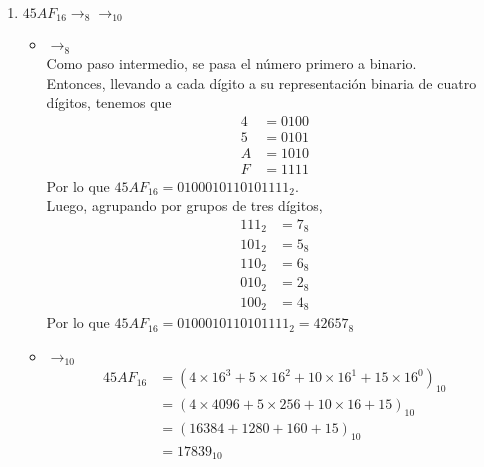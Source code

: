 \documentclass{article}
\begin{document}
\begin{enumerate}
{\begin{itemize}
{                }
            \end{itemize}
        }
        \item {
            $45AF_{16} \rightarrow_8 \rightarrow_{10}$
            \begin{itemize}
                \item {
                    $\rightarrow_8$ \\
                    Como paso intermedio, se pasa el número primero a binario.\\
                    Entonces, llevando a cada dígito a su representación 
                    binaria de cuatro dígitos, tenemos que 
                    \begin{align*}
                        4 &= 0100 \\
                        5 &= 0101 \\
                        A &= 1010 \\
                        F &= 1111
                    \end{align*}
                    Por lo que $45AF_{16} = 0100010110101111_{2}$. \\
                    Luego, agrupando por grupos de tres dígitos,
                    \begin{align*}
                        111_{2} &= 7_{8} \\
                        101_{2} &= 5_{8} \\
                        110_{2} &= 6_{8} \\
                        010_{2} &= 2_{8} \\
                        100_{2} &= 4_{8}
                    \end{align*}
                    Por lo que $45AF_{16} = 0100010110101111_{2} = 42657_{8}$
                }
                \item {
                    $\rightarrow_{10}$
                    \begin{align*}
                        45AF_{16} &= (4 \times 16^3 + 5 \times 16^2
                        + 10 \times 16^1 + 15 \times 16^0)_{10} \\
                                    &= (4 \times 4096 + 5 \times 256 
                                    + 10 \times 16 + 15)_{10} \\
                                    &= (16384 + 1280 + 160 + 15)_{10} \\
                                    &= 17839    _{10}
                    \end{align*}
                }
            \end{itemize}
        }
    \end{enumerate}
\end{document}
